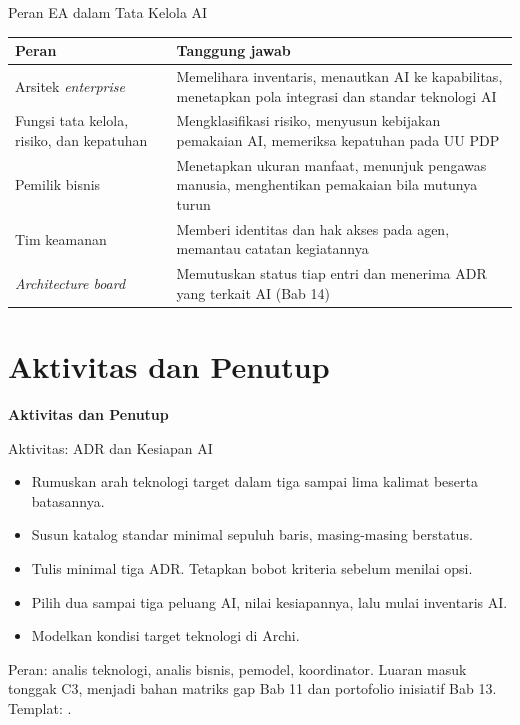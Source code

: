 \documentclass[aspectratio=169, table, 12pt]{beamer}
\begin{document}
\begin{frame}{{\Large Peran EA dalam Tata Kelola AI}}
  \footnotesize
  \begin{tabularx}{\textwidth}{L{3.6cm}Y}
    \hline
    \textbf{Peran} & \textbf{Tanggung jawab} \\
    \hline
    Arsitek \textit{enterprise} & Memelihara inventaris, menautkan AI ke kapabilitas, menetapkan pola integrasi dan standar teknologi AI \\
    \hline
    Fungsi tata kelola, risiko, dan kepatuhan & Mengklasifikasi risiko, menyusun kebijakan pemakaian AI, memeriksa kepatuhan pada UU PDP \\
    \hline
    Pemilik bisnis & Menetapkan ukuran manfaat, menunjuk pengawas manusia, menghentikan pemakaian bila mutunya turun \\
    \hline
    Tim keamanan & Memberi identitas dan hak akses pada agen, memantau catatan kegiatannya \\
    \hline
    \textit{Architecture board} & Memutuskan status tiap entri dan menerima ADR yang terkait AI (Bab 14) \\
    \hline
  \end{tabularx}
\end{frame}

\section{Aktivitas dan Penutup}

\begin{frame}{\hfill}
  \centering
  \Huge{\textbf{Aktivitas dan Penutup}}
\end{frame}

\begin{frame}{{\Large Aktivitas: ADR dan Kesiapan AI}}
  \small
  \begin{itemize}
    \item Rumuskan arah teknologi target dalam tiga sampai lima kalimat beserta batasannya.
    \item Susun katalog standar minimal sepuluh baris, masing-masing berstatus.
    \item Tulis minimal tiga ADR. Tetapkan bobot kriteria sebelum menilai opsi.
    \item Pilih dua sampai tiga peluang AI, nilai kesiapannya, lalu mulai inventaris AI.
    \item Modelkan kondisi target teknologi di Archi.
  \end{itemize}
  \footnotesize Peran: analis teknologi, analis bisnis, pemodel, koordinator. Luaran masuk tonggak C3,
  menjadi bahan matriks gap Bab 11 dan portofolio inisiatif Bab 13.
  Templat: .
\end{frame}
\end{document}
